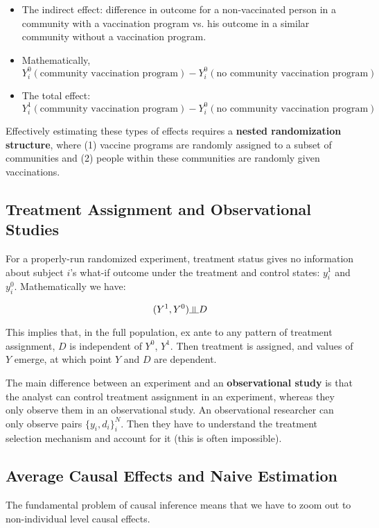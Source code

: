 \documentclass[12 pt, leqno]{article}
\newcommand{\indep}{\rotatebox[origin=c]{90}{$\models$}}
\begin{document}
\begin{itemize}
\item The indirect effect: difference in outcome for a non-vaccinated person in a community with a vaccination program vs. his outcome in a similar community without a vaccination program.

\item Mathematically, $Y_i^0(\text{community vaccination program}) - Y_i^0(\text{no community vaccination program})$

\item The total effect: $Y_i^1(\text{community vaccination program}) - Y_i^0(\text{no community vaccination program})$
\end{itemize}

Effectively estimating these types of effects requires a \textbf{nested randomization structure}, where (1) vaccine programs are randomly assigned to a subset of communities and (2) people within these communities are randomly given vaccinations.

\subsection{Treatment Assignment and Observational Studies}

For a properly-run randomized experiment, treatment status gives no information about subject $i$'s what-if outcome under the treatment and control states: $y_i^1$ and $y_i^0$. Mathematically we have:

$$(Y^1, Y^0) \indep D$$

This implies that, in the full population, ex ante to any pattern of treatment assignment, $D$ is independent of $Y^0$, $Y^1$. Then treatment is assigned, and values of $Y$ emerge, at which point $Y$ and $D$ are dependent. 

The main difference between an experiment and an \textbf{observational study} is that the analyst can control treatment assignment in an experiment, whereas they only observe them in an observational study. An observational researcher can only observe pairs $\{y_i, d_i\}_i^N$. Then they have to understand the treatment selection mechanism and account for it (this is often impossible).

\subsection{Average Causal Effects and Naive Estimation}

The fundamental problem of causal inference means that we have to zoom out to non-individual level causal effects.
\end{document}

